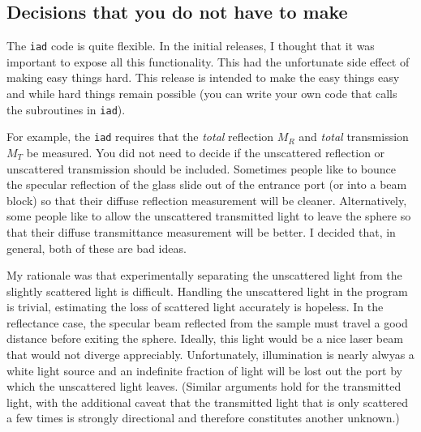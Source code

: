 \documentclass{article}
\newcommand\iadprog{\texttt{iad}}
\begin{document}
\subsection{Decisions that you do not have to make}

The \iadprog{} code is quite flexible.  In the initial releases, I thought that
it was important to expose all this functionality.  This had the unfortunate
side effect of making easy things hard.  This release is intended to 
make the easy things
easy and while hard things remain possible (you can write your own code
that calls the subroutines in \iadprog{}).

\begin{center}
\end{center}

For example, the \iadprog{} requires that the \textit{total} reflection $M_R$
and \textit{total} transmission $M_T$ be measured.  You 
did not need to decide if the unscattered reflection or unscattered
transmission should be included.  Sometimes people like to bounce the
specular reflection of the glass slide out of the entrance port (or into
a beam block) so that 
their diffuse reflection measurement will be cleaner.  Alternatively, 
some people like to allow the unscattered transmitted light to
leave the sphere so that their diffuse transmittance measurement will be
better.  I decided that, in general, both of these are bad ideas.

My rationale was that experimentally separating the unscattered light
from the slightly scattered light is difficult.  Handling the unscattered
light in the program is trivial, estimating the loss of scattered light
accurately is hopeless.  In the reflectance case, the specular beam
reflected from the sample must travel a good distance before exiting the
sphere.  Ideally, this light would be a nice laser beam that would not
diverge appreciably.  Unfortunately, illumination is nearly alwyas
a white light source and an indefinite fraction of light will be lost out
the port by which the unscattered light leaves.
(Similar arguments hold for the transmitted light, with the additional
caveat that the transmitted light that is only scattered a few times
is strongly directional and therefore constitutes another unknown.)
\end{document}
